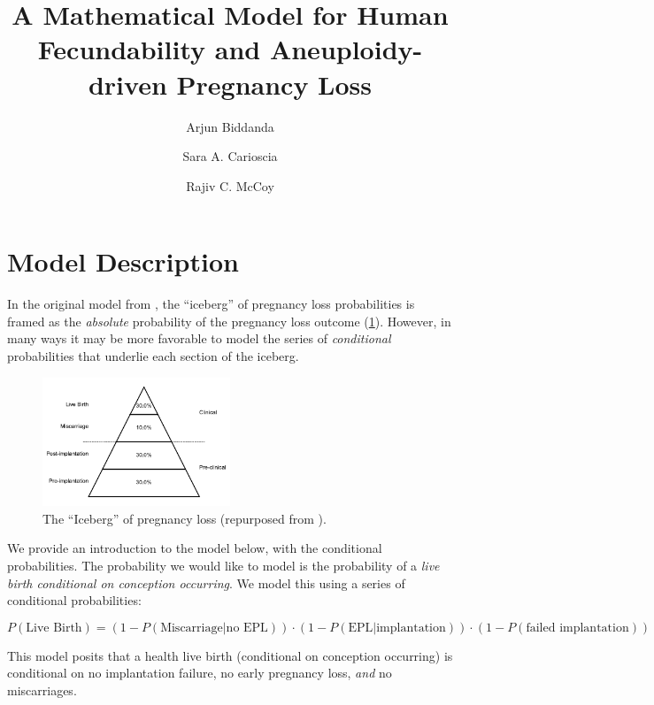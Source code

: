 \documentclass{article}
\title{A Mathematical Model for Human Fecundability and Aneuploidy-driven Pregnancy Loss}
\author[1]{Arjun Biddanda}
\author[1]{Sara A. Carioscia}
\author[1]{Rajiv C. McCoy}
\affil[1]{Department of Biology, Johns Hopkins University}
\begin{document}
\maketitle

\section*{Model Description}

In the original model from \citep{Macklon2002-zn}, the ``iceberg'' of pregnancy loss probabilities is framed as the \textit{absolute} probability of the pregnancy loss outcome (\ref{fig:1}). However, in many ways it may be more favorable to model the series of \textit{conditional} probabilities that underlie each section of the iceberg. 

\begin{figure}[H]
\begin{center}
    \includegraphics[width=0.5\textwidth]{figures/macklon_recreate.041724.pdf}
\end{center}
\vspace{-1.5em}
\caption{The ``Iceberg'' of pregnancy loss (repurposed from \citep{Macklon2002-zn}).}
\label{fig:1}
\end{figure}

We provide an introduction to the model below, with the conditional probabilities. The  probability we would like to model is the probability of a \textit{live birth conditional on conception occurring}. We model this using a series of conditional probabilities: 

\begin{equation}
	P(\text{Live Birth}) =  (1 - P(\text{Miscarriage} | \text{no EPL})) \cdot (1 - P(\text{EPL} | \text{implantation})) \cdot (1 - P(\text{failed implantation}))
\end{equation}

This model posits that a health live birth (conditional on conception occurring) is conditional on no implantation failure, no early pregnancy loss, \textit{and} no miscarriages.
\end{document}
